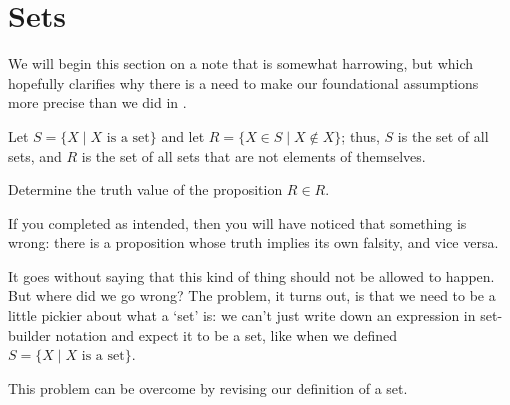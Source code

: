 \section{Sets}

We will begin this section on a note that is somewhat harrowing, but which hopefully clarifies why there is a need to make our foundational assumptions more precise than we did in .

\begin{exercise}
Let $S = \{ X \mid X \text{ is a set} \}$ and let $R = \{ X \in S \mid X \not\in X \}$; thus, $S$ is the set of all sets, and $R$ is the set of all sets that are not elements of themselves.

Determine the truth value of the proposition $R \in R$.
%
\end{exercise}

If you completed  as intended, then you will have noticed that something is wrong: there is a proposition whose truth implies its own falsity, and vice versa.

It goes without saying that this kind of thing should not be allowed to happen. But where did we go wrong? The problem, it turns out, is that we need to be a little pickier about what a `set' is: we can't just write down an expression in set-builder notation and expect it to be a set, like when we defined $S = \{ X \mid X \text{ is a set} \}$.

This problem can be overcome by revising our definition of a set.

